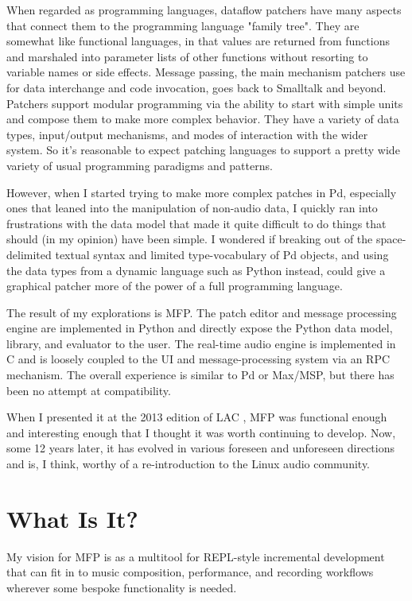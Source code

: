 \documentclass[a4paper]{article}
\def\:{\hskip0pt}
\begin{document}
When regarded as programming languages, dataflow patchers have
many aspects that connect them to the programming language
"family tree".  They are somewhat like functional languages,
in that values are returned from functions and marshaled into
parameter lists of other functions without resorting to variable
names or side effects.  Message passing, the main mechanism
patchers use for data interchange and code invocation, goes back
to Smalltalk and beyond. Patchers support modular programming
via the ability to start with simple units and compose them to
make more complex behavior. They have a variety of data types,
input/output mechanisms, and modes of interaction with the wider
system. So it's reasonable to expect patching languages to
support a pretty wide variety of usual programming paradigms and
patterns.

However, when I started trying to make more complex patch\-es in
Pd, especially ones that leaned into the manipulation of
non\:-\:audio data, I quickly ran into frustrations with the data
model that made it quite difficult to do things that should (in
my opinion) have been simple. I wondered if breaking out of the
space\:-\:delimited textual syntax and limited type\:-\:vocabulary of Pd
objects, and using the data types from a dynamic language such as
Python instead, could give a graphical patcher more of the power
of a full programming language.

The result of my explorations is MFP. The patch editor and
message processing engine are implemented in Python and directly
expose the Python data model, library, and evaluator to the user.
The real\:-\:time audio engine is implemented in C and is loosely
coupled to the UI and message\:-\:processing system via an RPC
mechanism. The overall experience is similar to Pd or Max/MSP,
but there has been no attempt at compatibility.

When I presented it at the 2013 edition of LAC
\cite{Gribble:2013}, MFP was functional enough and interesting
enough that I thought it was worth continuing to develop. Now,
some 12 years later, it has evolved in various foreseen and
unforeseen directions and is, I think, worthy of a
re\:-\:introduction to the Linux audio community.


\section{What Is It?}

My vision for MFP is as a multitool for REPL\:-\:style incremental
development that can fit in to music composition, performance,
and recording workflows wherever some bespoke functionality is
needed.
\end{document}
